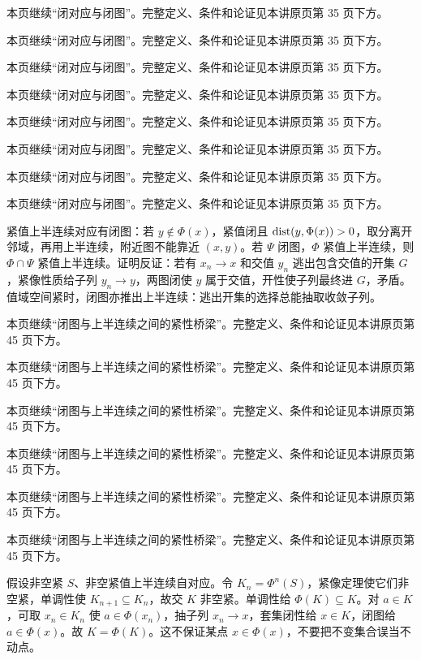 本页继续“闭对应与闭图”。完整定义、条件和论证见本讲原页第 35 页下方。

本页继续“闭对应与闭图”。完整定义、条件和论证见本讲原页第 35 页下方。

本页继续“闭对应与闭图”。完整定义、条件和论证见本讲原页第 35 页下方。

本页继续“闭对应与闭图”。完整定义、条件和论证见本讲原页第 35 页下方。

本页继续“闭对应与闭图”。完整定义、条件和论证见本讲原页第 35 页下方。

本页继续“闭对应与闭图”。完整定义、条件和论证见本讲原页第 35 页下方。

本页继续“闭对应与闭图”。完整定义、条件和论证见本讲原页第 35 页下方。

本页继续“闭对应与闭图”。完整定义、条件和论证见本讲原页第 35 页下方。

紧值上半连续对应有闭图：若 $y\notin\Phi(x)$，紧值闭且 $\operatorname{dist}(y,\Phi(x))>0$，取分离开邻域，再用上半连续，附近图不能靠近 $(x,y)$。若 $\Psi$ 闭图，$\Phi$ 紧值上半连续，则 $\Phi\cap\Psi$ 紧值上半连续。证明反证：若有 $x_n\to x$ 和交值 $y_n$ 逃出包含交值的开集 $G$，紧像性质给子列 $y_n\to y$，两图闭使 $y$ 属于交值，开性使子列最终进 $G$，矛盾。值域空间紧时，闭图亦推出上半连续：逃出开集的选择总能抽取收敛子列。

本页继续“闭图与上半连续之间的紧性桥梁”。完整定义、条件和论证见本讲原页第 45 页下方。

本页继续“闭图与上半连续之间的紧性桥梁”。完整定义、条件和论证见本讲原页第 45 页下方。

本页继续“闭图与上半连续之间的紧性桥梁”。完整定义、条件和论证见本讲原页第 45 页下方。

本页继续“闭图与上半连续之间的紧性桥梁”。完整定义、条件和论证见本讲原页第 45 页下方。

本页继续“闭图与上半连续之间的紧性桥梁”。完整定义、条件和论证见本讲原页第 45 页下方。

本页继续“闭图与上半连续之间的紧性桥梁”。完整定义、条件和论证见本讲原页第 45 页下方。

假设非空紧 $S$、非空紧值上半连续自对应。令 $K_n=\Phi^n(S)$，紧像定理使它们非空紧，单调性使 $K_{n+1}\subseteq K_n$，故交 $K$ 非空紧。单调性给 $\Phi(K)\subseteq K$。对 $a\in K$，可取 $x_n\in K_n$ 使 $a\in\Phi(x_n)$，抽子列 $x_n\to x$，套集闭性给 $x\in K$，闭图给 $a\in\Phi(x)$。故 $K=\Phi(K)$。这不保证某点 $x\in\Phi(x)$，不要把不变集合误当不动点。

